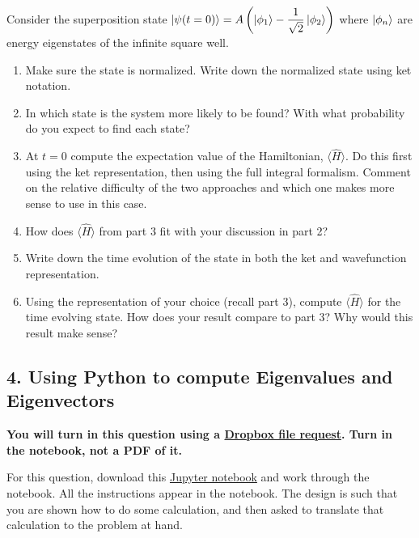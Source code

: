 \documentclass[
]{article}
\providecommand{\tightlist}{%
  \setlength{\itemsep}{0pt}\setlength{\parskip}{0pt}}
\providecommand{\tightlist}{%
  \setlength{\itemsep}{0pt}\setlength{\parskip}{0pt}}
\begin{document}
Consider the superposition state
\(\ket{\psi(t=0)} = A \left(\ket{\phi_1} - \dfrac{1}{\sqrt{2}}\ket{\phi_2}\right)\)
where \(\ket{\phi_n}\) are energy eigenstates of the infinite square
well.

\begin{enumerate}
\def\labelenumi{\arabic{enumi}.}
\tightlist
\item
  Make sure the state is normalized. Write down the normalized state
  using ket notation.
\item
  In which state is the system more likely to be found? With what
  probability do you expect to find each state?
\item
  At \(t=0\) compute the expectation value of the Hamiltonian,
  \(\langle \hat{H} \rangle\). Do this first using the ket
  representation, then using the full integral formalism. Comment on the
  relative difficulty of the two approaches and which one makes more
  sense to use in this case.
\item
  How does \(\langle \hat{H} \rangle\) from part 3 fit with your
  discussion in part 2?
\item
  Write down the time evolution of the state in both the ket and
  wavefunction representation.
\item
  Using the representation of your choice (recall part 3), compute
  \(\langle \hat{H} \rangle\) for the time evolving state. How does your
  result compare to part 3? Why would this result make sense?
\end{enumerate}

\hypertarget{using-python-to-compute-eigenvalues-and-eigenvectors}{%
\subsection{4. Using Python to compute Eigenvalues and
Eigenvectors}\label{using-python-to-compute-eigenvalues-and-eigenvectors}}

\textbf{You will turn in this question using a
\href{https://www.dropbox.com/request/vscBnPjYqOEUk1VyPOO0}{Dropbox file
request}. Turn in the notebook, not a PDF of it.}

For this question, download this
\href{./notebooks/Homework2_Problem4_STUDENT.ipynb}{Jupyter notebook}
and work through the notebook. All the instructions appear in the
notebook. The design is such that you are shown how to do some
calculation, and then asked to translate that calculation to the problem
at hand.
\end{document}

